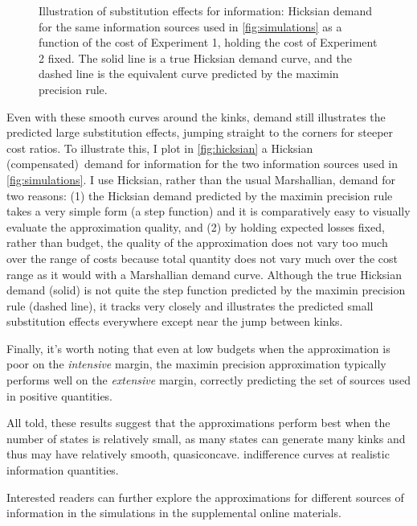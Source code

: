 \documentclass{fancyArticle}
\renewcommand{\|}{\,|\,}                    %
\providecommand{\;}{\,;}                    %
\begin{document}
\begin{figure}[t]
\begin{minipage}{0.45\linewidth}
  \end{minipage}
  \caption{Illustration of substitution effects for information: Hicksian demand for the same information sources used in \autoref{fig:simulations} as a function of the cost of Experiment 1, holding the cost of Experiment 2 fixed. The solid line is a true Hicksian demand curve, and the dashed line is the equivalent curve predicted by the maximin precision rule.}
  \label{fig:hicksian}
\end{figure}

Even with these smooth curves around the kinks, demand still illustrates the predicted large substitution effects, jumping straight to the corners for steeper cost ratios.
To illustrate this, I plot in \autoref{fig:hicksian} a Hicksian (compensated)\footnotemark\ demand for information for the two information sources used in \autoref{fig:simulations}.
I use Hicksian, rather than the usual Marshallian, demand for two reasons: (1) the Hicksian demand predicted by the maximin precision rule takes a very simple form (a step function) and it is comparatively easy to visually evaluate the approximation quality,
and (2) by holding expected losses fixed, rather than budget, the quality of the approximation does not vary too much over the range of costs because total quantity does not vary much over the cost range as it would with a Marshallian demand curve.
Although the true Hicksian demand (solid) is not quite the step function predicted by the maximin precision rule (dashed line), it tracks very closely and illustrates the predicted small substitution effects everywhere except near the jump between kinks.

Finally, it's worth noting that even at low budgets when the approximation is poor on the \textit{intensive} margin, the maximin precision approximation typically performs well on the \textit{extensive} margin, correctly predicting the set of sources used in positive quantities.

All told, these results suggest that the approximations perform best when the number of states is relatively small, as many states can generate many kinks and thus may have relatively smooth, quasiconcave. indifference curves at realistic information quantities.

Interested readers can further explore the approximations for different sources of information in the simulations in the supplemental online materials.\footnotemark
{}
\end{document}
